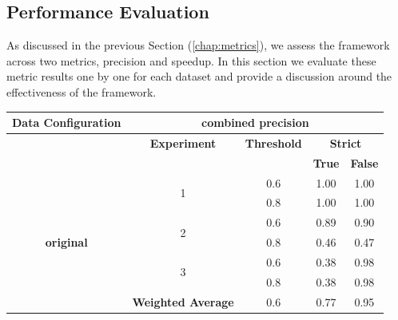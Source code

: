 \documentclass{mpaper}
\begin{document}
\subsection{Performance Evaluation}

As discussed in the previous Section (\ref{chap:metrics}), we assess the framework across two metrics, precision and speedup. In this section we evaluate these metric results one by one for each dataset and provide a discussion around the effectiveness of the framework.

\begin{table}[]
\centering
\begin{tabular}{|c|cccc|}
\hline
\textbf{Data Configuration} & \multicolumn{4}{c|}{\textbf{combined precision}}                                                                                \\ \hline
\textbf{}                   & \multicolumn{1}{c|}{\textbf{Experiment}}       & \multicolumn{1}{c|}{\textbf{Threshold}} & \multicolumn{2}{c|}{\textbf{Strict}} \\ \cline{2-5} 
                            & \multicolumn{1}{l|}{}                          & \multicolumn{1}{c|}{}                   & \textbf{True}    & \textbf{False}    \\ \cline{2-5} 
                            & \multicolumn{1}{c|}{\multirow{2}{*}{1}}        & \multicolumn{1}{c|}{0.6}                & 1.00             & 1.00              \\
                            & \multicolumn{1}{c|}{}                          & \multicolumn{1}{c|}{0.8}                & 1.00             & 1.00              \\ \cline{2-5} 
                            & \multicolumn{1}{c|}{\multirow{2}{*}{2}}        & \multicolumn{1}{c|}{0.6}                & 0.89             & 0.90              \\
\textbf{original}           & \multicolumn{1}{c|}{}                          & \multicolumn{1}{c|}{0.8}                & 0.46             & 0.47              \\ \cline{2-5} 
                            & \multicolumn{1}{c|}{\multirow{2}{*}{3}}        & \multicolumn{1}{c|}{0.6}                & 0.38             & 0.98              \\
                            & \multicolumn{1}{c|}{}                          & \multicolumn{1}{c|}{0.8}                & 0.38             & 0.98              \\ \cline{2-5} 
                            & \multicolumn{1}{c|}{\textbf{Weighted Average}} & \multicolumn{1}{c|}{0.6}                & 0.77             & 0.95              \\

\end{tabular}
\end{table}
\end{document}
